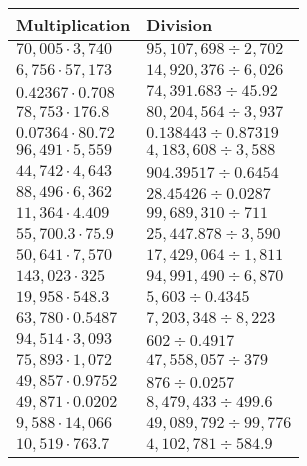 \begin{longtable}[]{@{}ll@{}}
\toprule
Multiplication & Division\tabularnewline
\midrule
\endhead
\(70,005\cdot3,740\) & \(95,107,698÷2,702\)\tabularnewline
\(6,756\cdot57,173\) & \(14,920,376÷6,026\)\tabularnewline
\(0.42367\cdot 0.708\) & \(74,391.683÷45.92\)\tabularnewline
\(78,753\cdot176.8\) & \(80,204,564÷3,937\)\tabularnewline
\(0.07364\cdot80.72\) & \(0.138443÷0.87319\)\tabularnewline
\(96,491\cdot5,559\) & \(4,183,608÷3,588\)\tabularnewline
\(44,742\cdot4,643\) & \(904.39517÷0.6454\)\tabularnewline
\(88,496\cdot6,362\) & \(28.45426÷0.0287\)\tabularnewline
\(11,364\cdot4.409\) & \(99,689,310÷711\)\tabularnewline
\(55,700.3\cdot 75.9\) & \(25,447.878÷3,590\)\tabularnewline
\(50,641\cdot 7,570\) & \(17,429,064÷1,811\)\tabularnewline
\(143,023\cdot325\) & \(94,991,490÷6,870\)\tabularnewline
\(19,958\cdot548.3\) & \(5,603÷0.4345\)\tabularnewline
\(63,780\cdot0.5487\) & \(7,203,348÷8,223\)\tabularnewline
\(94,514\cdot3,093\) & \(602÷0.4917\)\tabularnewline
\(75,893\cdot1,072\) & \(47,558,057÷379\)\tabularnewline
\(49,857\cdot0.9752\) & \(876÷0.0257\)\tabularnewline
\(49,871\cdot0.0202\) & \(8,479,433÷499.6\)\tabularnewline
\(9,588\cdot14,066\) & \(49,089,792÷99,776\)\tabularnewline
\(10,519\cdot763.7\) & \(4,102,781÷584.9\)\tabularnewline
\bottomrule
\end{longtable}
